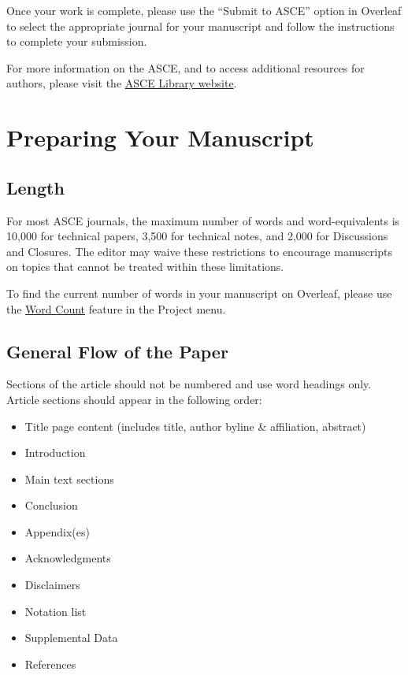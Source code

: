 \documentclass[Journal,letterpaper]{ascelike-new}
\begin{document}
Once your work is complete, please use the ``Submit to ASCE'' option in Overleaf to select the appropriate journal for your manuscript and follow the instructions to complete your submission.

For more information on the ASCE, and to access additional resources for authors, please visit the \href{http://ascelibrary.org/page/authors}{ASCE Library website}.

\section{Preparing Your Manuscript}

\subsection{Length}

For most ASCE journals, the maximum number of words and word-equivalents is 10,000 for technical papers, 3,500 for technical notes, and 2,000 for Discussions and Closures. The editor may waive these restrictions to encourage manuscripts on topics that cannot be treated within these limitations.

To find the current number of words in your manuscript on Overleaf, please use the \href{https://www.overleaf.com/help/85}{Word Count} feature in the Project menu.

\subsection{General Flow of the Paper}

Sections of the article should not be numbered and use word headings only. Article sections should appear in the following order:

\begin{itemize}
\item Title page content (includes title, author byline \& affiliation, abstract)
\item Introduction
\item Main text sections
\item Conclusion
\item Appendix(es)
\item Acknowledgments
\item Disclaimers
\item Notation list
\item Supplemental Data
\item References
\end{itemize}
\end{document}
